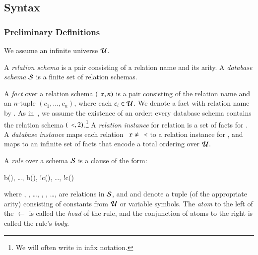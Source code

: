 \subsection{Syntax}

\subsubsection{Preliminary Definitions}


We assume an infinite universe $\univ$.

A {\em relation schema} is a pair consisting of a relation name and its arity.
A {\em database schema} $\schema$ is a finite set of relation schemas.

A {\em fact} over a relation schema $(\dedalus{r}, n)$ is a pair consisting of
the relation name  and an $n$-tuple $(c_1,\ldots,c_n)$, where each
$c_i \in \univ$.  We denote a fact with relation name  by
.  As in~\cite{immerman-ptime}, we assume
the existence of an order: every database schema contains the relation schema
$(\dedalus{<},2)$.\footnote{We will often write \dedalus{<} in infix notation.} 
A {\em relation instance} for relation  is a  set of facts for
.  A {\em database instance} maps each relation $\dedalus{r} \ne
\dedalus{<}$ to a relation instance for , and maps \dedalus{<} to an
infinite set of \dedalus{<} facts that encode a total ordering over $\univ$.  

A {\em rule} over a schema $\schema$ is a clause of the form:

\begin{Drules}
        {b(), \ldots, b(), !c(), \ldots, !c()}
\end{Drules}

where , , \ldots, ,
, \ldots,  are relations in
$\schema$, and  and 
denote a tuple (of the appropriate arity) consisting of
constants from $\univ$ or variable symbols.  The {\em atom} to the left of the $\leftarrow$ is called the {\em head} of the rule, and the conjunction of atoms to the right is called the rule's {\em body}.  

